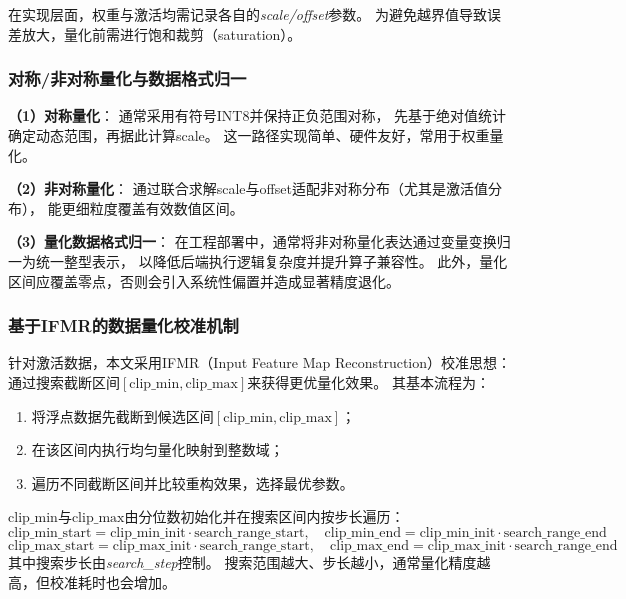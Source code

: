 在实现层面，权重与激活均需记录各自的\textit{scale/offset}参数。
为避免越界值导致误差放大，量化前需进行饱和裁剪（saturation）。

\subsubsection{对称/非对称量化与数据格式归一}

\textbf{（1）对称量化}：
通常采用有符号INT8并保持正负范围对称，
先基于绝对值统计确定动态范围，再据此计算scale。
这一路径实现简单、硬件友好，常用于权重量化。

\textbf{（2）非对称量化}：
通过联合求解scale与offset适配非对称分布（尤其是激活值分布），
能更细粒度覆盖有效数值区间。

\textbf{（3）量化数据格式归一}：
在工程部署中，通常将非对称量化表达通过变量变换归一为统一整型表示，
以降低后端执行逻辑复杂度并提升算子兼容性。
此外，量化区间应覆盖零点，否则会引入系统性偏置并造成显著精度退化。

\subsubsection{基于IFMR的数据量化校准机制}

针对激活数据，本文采用IFMR（Input Feature Map Reconstruction）校准思想：
通过搜索截断区间$[\mathrm{clip\_min},\mathrm{clip\_max}]$来获得更优量化效果。
其基本流程为：
\begin{enumerate}[nosep,leftmargin=*]
	\item 将浮点数据先截断到候选区间$[\mathrm{clip\_min},\mathrm{clip\_max}]$；
	\item 在该区间内执行均匀量化映射到整数域；
	\item 遍历不同截断区间并比较重构效果，选择最优参数。
\end{enumerate}

$\mathrm{clip\_min}$与$\mathrm{clip\_max}$由分位数初始化并在搜索区间内按步长遍历：
\begin{equation}
\mathrm{clip\_min\_start}=\mathrm{clip\_min\_init}\cdot\mathrm{search\_range\_start},
\quad
\mathrm{clip\_min\_end}=\mathrm{clip\_min\_init}\cdot\mathrm{search\_range\_end}
\end{equation}
\begin{equation}
\mathrm{clip\_max\_start}=\mathrm{clip\_max\_init}\cdot\mathrm{search\_range\_start},
\quad
\mathrm{clip\_max\_end}=\mathrm{clip\_max\_init}\cdot\mathrm{search\_range\_end}
\end{equation}
其中搜索步长由\textit{search\_step}控制。
搜索范围越大、步长越小，通常量化精度越高，但校准耗时也会增加。

